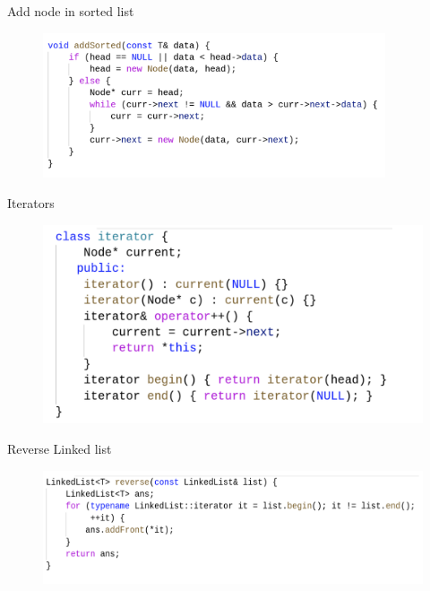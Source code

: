 \documentclass{beamer}
\begin{document}
\begin{frame}{Add node in sorted list}
        \begin{figure}
            \includegraphics[width=0.9\textwidth]{LL_addsorted.png}
    \end{figure}
\end{frame}

\begin{frame}{Iterators}
        \begin{figure}
            \includegraphics[width=\textwidth]{LL_iterator.png}
    \end{figure}
\end{frame}

\begin{frame}{Reverse Linked list}
        \begin{figure}
            \includegraphics[width=\textwidth]{LL_reverse.png}
    \end{figure}
\end{frame}
\end{document}
